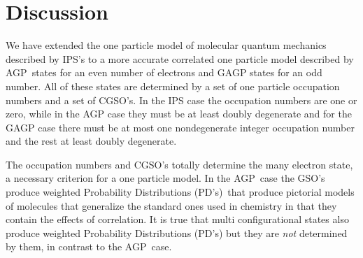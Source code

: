 \documentclass[aps,preprint]{revtex4}%
\begin{document}
\section{Discussion\label{Discussion}}

We have extended the one particle model of molecular quantum mechanics
described by IPS's to a more accurate correlated one particle model described
by AGP\ states for an even number of electrons and GAGP states for an odd
number. All of these states are determined by a set of one particle occupation
numbers and a set of CGSO's. In the IPS case the occupation numbers are one or
zero, while in the AGP case they must be at least doubly degenerate and for
the GAGP case there must be at most one nondegenerate integer occupation
number and the rest at least doubly degenerate.

The occupation numbers and CGSO's totally determine the many electron state, a
necessary criterion for a one particle model. In the AGP\ case the GSO's
produce weighted Probability Distributions (PD's)\ that produce pictorial
models of molecules that generalize the standard ones used in chemistry in
that they contain the effects of correlation. It is true that multi
configurational states also produce weighted Probability Distributions (PD's)
but they are \emph{not} determined by them, in contrast to the AGP\ case.
\end{document}
